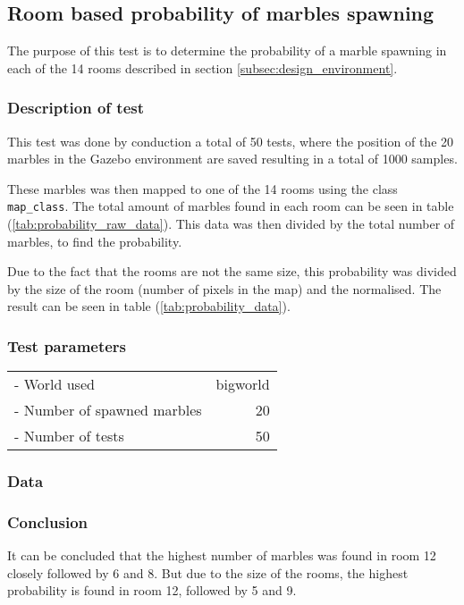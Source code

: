 \documentclass[../Head/Main.tex]{subfiles}
\begin{document}
\subsection{Room based probability of marbles spawning}
\label{subsec:probability_test}
The purpose of this test is to determine the probability of a marble spawning in each of the 14 rooms described in section \ref{subsec:design_environment}.

\subsubsection*{Description of test}
This test was done by conduction a total of 50 tests, where the position of the 20 marbles in the Gazebo environment are saved resulting in a total of 1000 samples.\par 
These marbles was then mapped to one of the 14 rooms using the  class \texttt{map\_class}. The total amount of marbles found in each room can be seen in table (\ref{tab:probability_raw_data}). This data was then divided by the total number of marbles, to find the probability.\par 
Due to the fact that the rooms are not the same size, this probability was divided by the size of the room (number of pixels in the map) and the normalised. The result can be seen in table (\ref{tab:probability_data}).

\subsubsection*{Test parameters}
\begin{tabular}{l r}
	- World used                & bigworld\\	
	- Number of spawned marbles & 20\\
	- Number of tests           & 50
\end{tabular}

\subsubsection*{Data}
\begin{minipage}[c]{0.45\textwidth}
	
\end{minipage}
\hfill
\begin{minipage}[c]{0.49\textwidth}
	
\end{minipage}

\subsubsection*{Conclusion}
It can be concluded that the highest number of marbles was found in room 12 closely followed by 6 and 8. But due to the size of the rooms, the highest probability is found in room 12, followed by 5 and 9.
\end{document}
